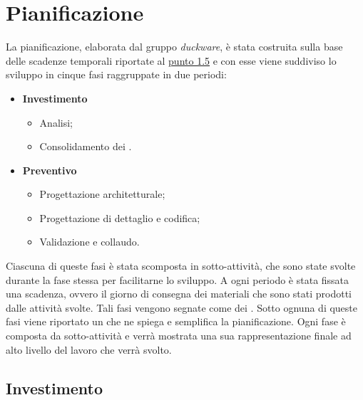 \clearpage
\section{Pianificazione}
La pianificazione, elaborata dal gruppo \emph{duckware}, è stata costruita sulla base delle scadenze temporali riportate al \hyperlink{scadenze}{punto 1.5} e con esse viene suddiviso lo sviluppo in cinque fasi raggruppate in due periodi:
\begin{itemize}
	\item \textbf{Investimento}
		\begin{itemize}
			\item Analisi;
			\item Consolidamento dei .
		\end{itemize}
	\item \textbf{Preventivo}
	\begin{itemize}
		\item Progettazione architetturale;
		\item Progettazione di dettaglio e codifica;
		\item Validazione e collaudo.
	\end{itemize}
\end{itemize}
Ciascuna di queste fasi è stata scomposta in sotto-attività, che sono state svolte durante la fase stessa per facilitarne lo sviluppo. A ogni periodo è stata fissata una scadenza, ovvero il giorno di consegna dei materiali che sono stati prodotti dalle attività svolte. Tali fasi vengono segnate come  dei . Sotto ognuna di queste fasi viene riportato un  che ne spiega e semplifica la pianificazione. Ogni fase è composta da sotto-attività e verrà mostrata una sua rappresentazione finale ad alto livello del lavoro che verrà svolto.
\subsection{Investimento}

